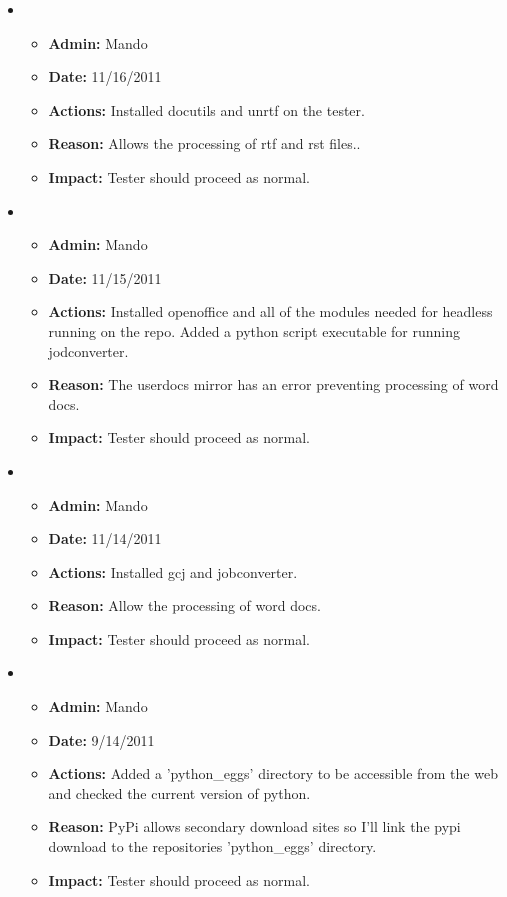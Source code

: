 \documentclass[12pt]{article}
\begin{document}
\begin{itemize}
\item
  \begin{itemize}
  \item[] {\bf Admin:} Mando
  \item[] {\bf Date:} 11/16/2011
  \item[] {\bf Actions:} Installed docutils and unrtf on the tester.
  \item[] {\bf Reason:} Allows the processing of rtf and rst files.. 
  \item[] {\bf Impact:} Tester should proceed as normal.
  \end{itemize}
  
\item
  \begin{itemize}
  \item[] {\bf Admin:} Mando
  \item[] {\bf Date:} 11/15/2011
  \item[] {\bf Actions:} Installed openoffice and all of the modules needed for headless running on the repo. Added a python script executable for running jodconverter.
  \item[] {\bf Reason:} The userdocs mirror has an error preventing processing of word docs. 
  \item[] {\bf Impact:} Tester should proceed as normal.
  \end{itemize}
  
\item
  \begin{itemize}
  \item[] {\bf Admin:} Mando
  \item[] {\bf Date:} 11/14/2011
  \item[] {\bf Actions:} Installed gcj and jobconverter.
  \item[] {\bf Reason:} Allow the processing of word docs.
  \item[] {\bf Impact:} Tester should proceed as normal.
  \end{itemize}
  
\item
  \begin{itemize}
  \item[] {\bf Admin:} Mando
  \item[] {\bf Date:} 9/14/2011
  \item[] {\bf Actions:} Added a 'python\_eggs' directory to be accessible from the web and checked the current version of python.
  \item[] {\bf Reason:} PyPi allows secondary download sites so I'll link the pypi download to the repositories 'python\_eggs' directory.
  \item[] {\bf Impact:} Tester should proceed as normal.
  \end{itemize}
  

\end{itemize}
\end{document}

